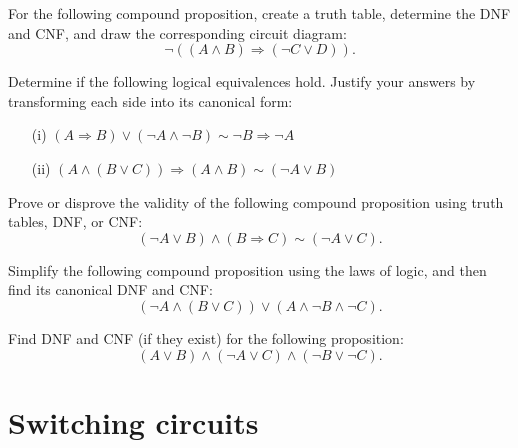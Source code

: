 \documentclass[11pt,paper=b5,footinclude,headinclude]{scrbook} %
\theoremstyle{remark}
\theoremstyle{definition} %
\theoremstyle{theorem} %
\newtheorem{ex}{Exercise\hypertarget{sol:\theex}}[chapter]
\begin{document}
\begin{ex}
For the following compound proposition, create a truth table, determine the DNF and CNF, and draw the corresponding circuit diagram:
\[
\neg((A \land B) \Rightarrow (\neg C \lor D)).
\]
\end{ex}

\begin{ex}
Determine if the following logical equivalences hold. Justify your answers by transforming each side into its canonical form:
\begin{itemize}
    \item[(i)] \((A \Rightarrow B) \lor (\neg A \land \neg B) \sim \neg B \Rightarrow \neg A\)
    \item[(ii)] \((A \land (B \lor C)) \Rightarrow (A \land B) \sim (\neg A \lor B)\)
\end{itemize}
\end{ex}

\begin{ex}
Prove or disprove the validity of the following compound proposition using truth tables, DNF, or CNF:
\[
(\neg A \lor B) \land (B \Rightarrow C) \sim (\neg A \lor C).
\]
\end{ex}

\begin{ex}
Simplify the following compound proposition using the laws of logic, and then find its canonical DNF and CNF:
\[
(\neg A \land (B \lor C)) \lor (A \land \neg B \land \neg C).
\]
\end{ex}

\begin{ex}
Find DNF and CNF (if they exist) for the following proposition:
\[
(A \lor B) \land (\neg A \lor C) \land (\neg B \lor \neg C).
\]
\end{ex}

\section{Switching circuits}
\end{document}
